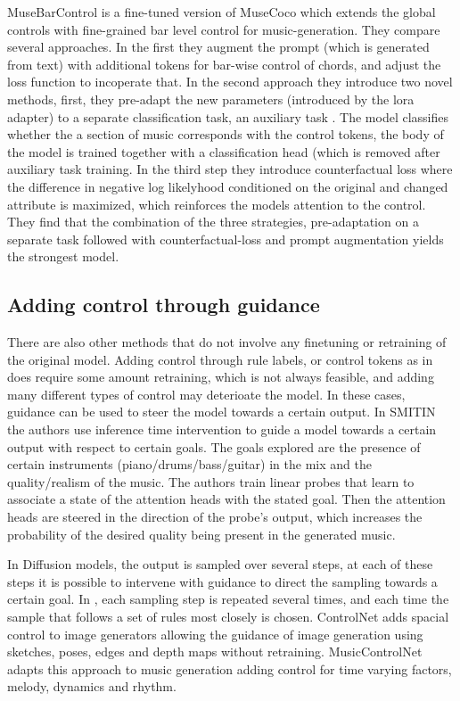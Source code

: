 MuseBarControl \cite{Shu_Xu_Musebarcontrol_2024} is a fine-tuned version of MuseCoco\cite{Lu_Xu_Kang_Yu_Xing_Tan_Bian_MuseCoco_2023} which extends the global controls with fine-grained bar level control for music-generation. They compare several approaches. In the first they augment the prompt (which is generated from text) with additional tokens for bar-wise control of chords, and adjust the loss function to incoperate that.  In the second approach they introduce two novel methods, first, they pre-adapt the new parameters (introduced by the lora adapter) to a separate classification task, an auxiliary task . The model classifies whether the a section of music corresponds with the control tokens, the body of the model is trained together with a classification head (which is removed after auxiliary task training. In the third step they introduce counterfactual loss where the difference in negative log likelyhood conditioned on the original and changed attribute is maximized, which reinforces the models attention to the control. They find that the combination of the three strategies, pre-adaptation on a separate task followed with counterfactual-loss and prompt augmentation yields the strongest model. 

\subsection{Adding control through guidance}
There are also other methods that do not involve any finetuning or retraining of the original model. Adding control through rule labels, or control tokens as in \cite{Rütte_figaro_2023}\cite{Lan_Hsiao_Cheng_Yang_musicongen_2024} does require some amount  retraining, which is not always feasible, and adding many different types of control may deterioate the model. In these cases, guidance can be used to steer the model towards a certain output.
In SMITIN \cite{Koo_Wichern_Germain_SMITIN_2024} the authors use inference time intervention to guide a model towards a certain output with respect to certain goals. The goals explored are the presence of certain instruments (piano/drums/bass/guitar) in the mix and the quality/realism of the music. The authors train linear probes that learn to associate a state of the attention heads with the stated goal. Then the attention heads are steered in the direction of the probe’s output, which increases the probability of the desired quality being present in the generated music.   

In Diffusion models, the output is sampled over several steps, at each of these steps it is possible to intervene with guidance to direct the sampling towards a certain goal. In \cite{Huang_rule_diffusion_2024}, each sampling step is repeated several times, and each time the sample that follows a set of rules most closely is chosen. ControlNet \cite{Zhang_Rao_Agrawala_2023} adds spacial control to image generators allowing the guidance of image generation using sketches, poses, edges and depth maps without retraining. MusicControlNet \cite{musicwellbeing_agres_2021} adapts this approach to music generation adding control for time varying factors, melody, dynamics and rhythm. 


